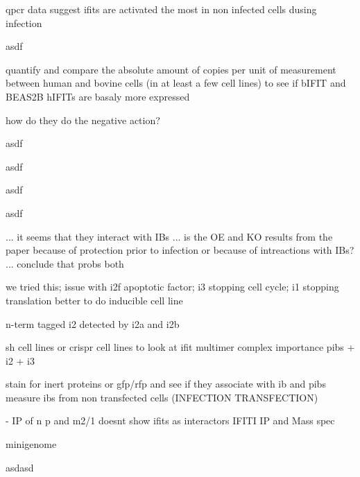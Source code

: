 qpcr data suggest ifits are activated the most in non infected cells dusing infection

asdf

quantify and compare the absolute amount of copies per unit of measurement between human and bovine cells (in at least a few cell lines) to see if bIFIT and BEAS2B hIFITs are basaly more expressed

how do they do the negative action?

asdf

asdf

asdf

asdf


... it seems that they interact with IBs ... is the OE and KO results from the paper because of protection prior to infection or because of intreactions with IBs? ... conclude that probs both



we tried this; issue with i2f apoptotic factor; i3 stopping cell cycle; i1 stopping translation
better to do inducible cell line

n-term tagged i2 detected by i2a and i2b

sh cell lines or crispr cell lines to look at ifit multimer complex importance
pibs + i2 + i3

stain for inert proteins or gfp/rfp and see if they associate with ib and pibs
measure ibs from non transfected cells (INFECTION TRANSFECTION)

\cite{Oliveira2013HumanCells} - IP of n p and m2/1 doesnt show ifits as interactors
IFITI IP and Mass spec

minigenome

asdasd

